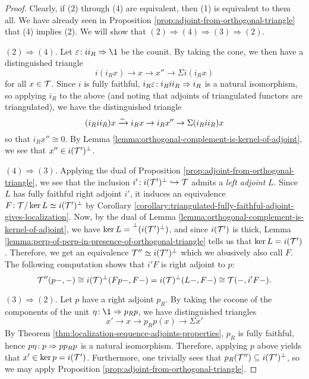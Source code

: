 \begin{proof}
Clearly, if (2) through (4) are equivalent, then (1) is equivalent to them all. We have already seen in Proposition \ref{prop:adjoint-from-orthogonal-triangle} that (4) implies (2). We will show that
\((2)\Rightarrow(4)\Rightarrow(3)\Rightarrow(2)\).%

\((2)\Rightarrow(4)\). Let \(\varepsilon\!:ii_R\To\1\) be the counit. By taking the cone, we then have a distinguished triangle
\[ i(i_Rx) \to x \to x'' \to \Sigma i(i_Rx) \]
for all \(x\in\mathcal{T}\). Since \(i\) is fully faithful, \(i_R\varepsilon\!: i_Rii_R\Rightarrow i_R\) is a natural isomorphism, so applying \(i_R\) to the above (and noting that adjoints of triangulated
functors are triangulated), we have the distinguished triangle
\[ (i_Rii_R)x \xrightarrow{\sim} i_Rx \to i_Rx'' \to \Sigma (i_Rii_R)x \]
so that \(i_Rx'' \cong 0\). By Lemma \ref{lemma:orthogonal-complement-is-kernel-of-adjoint}, we see that \(x''\in i(\mathcal{T}')^\perp\).

\((4)\Rightarrow(3)\). Applying the dual of Proposition \ref{prop:adjoint-from-orthogonal-triangle}, we see that the inclusion \(i'\!:i(\mathcal{T}')^\perp \hookrightarrow \mathcal{T}\) admits a \emph{left adjoint} \(L\).
Since \(L\) has fully faithful right adjoint \(i'\), it induces an equivalence \(F\!:\mathcal{T}/\ker{L}\simeq i(\mathcal{T}')^\perp\) by Corollary \ref{corollary:triangulated-fully-faithful-adjoint-gives-localization}.
Now, by the dual of Lemma \ref{lemma:orthogonal-complement-is-kernel-of-adjoint}, we have \(\ker{L} = \prescript{\perp}{}{(i(\ensuremath{\mathcal{T}}')^\perp)}\), and since \(i(\mathcal{T}')\) is thick, Lemma \ref{lemma:perp-of-perp-in-presence-of-orthogonal-triangle}
tells us that \(\ker{L} = i(\mathcal{T}')\). Therefore, we get an equivalence \(\mathcal{T}'' \simeq i(\mathcal{T}')^\perp\) which we abusively also call \(F\).
The following computation shows that \(i'F\) is right adjoint to \(p\):
\[ \mathcal{T}''(p-,-) \cong i(\mathcal{T})^\perp(Fp-,F-) = i(\mathcal{T})^\perp(L-,F-) \cong \mathcal{T}(-,i'F-). \]

\((3)\Rightarrow(2)\). Let \(p\) have a right adjoint \(p_{R}\). By taking the cocone of the components of the unit \(\eta\!:\1\To p_Rp\), we have distinguished triangles
\[ x' \to x \to p_Rp(x) \to \Sigma x' \]
By Theorem \ref{thm:localization-sequence-adjoints-properties}, \(p_R\) is fully faithful, hence \(p\eta\!:p \Rightarrow pp_Rp\) is a natural isomorphism. Therefore, applying \(p\) above yields
that \(x'\in\ker{p} = i(\mathcal{T}')\). Furthermore, one trivially sees that \(p_R(\mathcal{T}'') \subseteq i(\mathcal{T}')^\perp\), so we may apply Proposition \ref{prop:adjoint-from-orthogonal-triangle}.


\end{proof}
